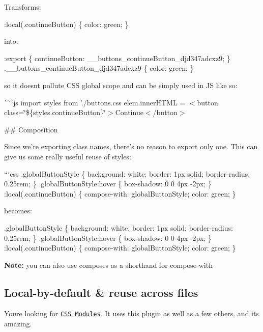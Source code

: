 \href{https://travis-ci.org/css-modules/postcss-modules-scope}{\tt }

Transforms\+:


\begin{DoxyCode}
:local(.continueButton) \{
  color: green;
\}
\end{DoxyCode}


into\+:


\begin{DoxyCode}
:export \{
  continueButton: \_\_buttons\_continueButton\_djd347adcxz9;
\}
.\_\_buttons\_continueButton\_djd347adcxz9 \{
  color: green;
\}
\end{DoxyCode}


so it doesn\textquotesingle{}t pollute C\+SS global scope and can be simply used in JS like so\+:

\`{}\`{}`js import styles from './buttons.css\textquotesingle{} elem.\+inner\+H\+T\+ML = {\ttfamily $<$button class=\char`\"{}\$\{styles.\+continue\+Button\}\char`\"{}$>$Continue$<$/button$>$} 
\begin{DoxyCode}
## Composition

Since we're exporting class names, there's no reason to export only one. This can give us some really
       useful reuse of styles:

```css
.globalButtonStyle \{
  background: white;
  border: 1px solid;
  border-radius: 0.25rem;
\}
.globalButtonStyle:hover \{
  box-shadow: 0 0 4px -2px;
\}
:local(.continueButton) \{
  compose-with: globalButtonStyle;
  color: green;
\}
\end{DoxyCode}


becomes\+:


\begin{DoxyCode}
.globalButtonStyle \{
  background: white;
  border: 1px solid;
  border-radius: 0.25rem;
\}
.globalButtonStyle:hover \{
  box-shadow: 0 0 4px -2px;
\}
:local(.continueButton) \{
  compose-with: globalButtonStyle;
  color: green;
\}
\end{DoxyCode}


{\bfseries Note\+:} you can also use {\ttfamily composes} as a shorthand for {\ttfamily compose-\/with}

\subsection*{Local-\/by-\/default \& reuse across files}

You\textquotesingle{}re looking for \href{https://github.com/css-modules/css-modules}{\tt C\+SS Modules}. It uses this plugin as well as a few others, and it\textquotesingle{}s amazing.

